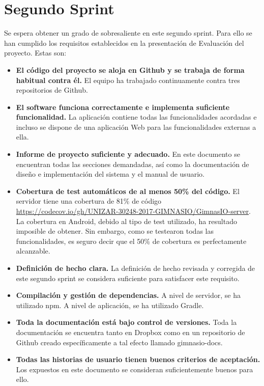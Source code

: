 \documentclass[11pt,a4paper]{report}
\begin{document}
\section{Segundo Sprint}
Se espera obtener un grado de sobresaliente en este segundo sprint. Para ello se han cumplido los requisitos establecidos en la presentación de Evaluación del proyecto. Estas son:
\begin{itemize}
	\item 	\textbf{El código del proyecto se aloja en Github y se trabaja de forma habitual contra él.} El equipo ha trabajado continuamente contra tres repositorios de Github.
	\item \textbf{El software funciona correctamente e implementa suficiente funcionalidad.} La aplicación contiene todas las funcionalidades acordadas e incluso se dispone de una aplicación Web para las funcionalidades externas a ella.

	\item \textbf{Informe de proyecto suficiente y adecuado.} En este documento se encuentran todas las secciones demandadas, así como la documentación de diseño e implementación del sistema y el manual de usuario.

	\item \textbf{Cobertura de test automáticos de al menos 50\% del código.} El servidor tiene una cobertura de 81\% de código \url{https://codecov.io/gh/UNIZAR-30248-2017-GIMNASIO/GimnasIO-server}. La cobertura en Android, debido al tipo de test utilizado, ha resultado imposible de obtener. Sin embargo, como se testearon todas las funcionalidades, es seguro decir que el 50\% de cobertura es perfectamente alcanzable.

	\item \textbf{Definición de hecho clara.} La definición de hecho revisada y corregida de este segundo sprint se considera suficiente para satisfacer este requisito.

	\item \textbf{Compilación y gestión de dependencias.} A nivel de servidor, se ha utilizado npm. A nivel de aplicación, se ha utilizado Gradle.

	\item \textbf{Toda la documentación está bajo control de versiones. }Toda la documentación se encuentra tanto en Dropbox como en un repositorio de Github creado específicamente a tal efecto llamado gimnasio-docs.

	\item \textbf{Todas las historias de usuario tienen buenos criterios de aceptación.} Los expuestos en este documento se consideran suficientemente buenos para ello.


\end{itemize}
\end{document}
